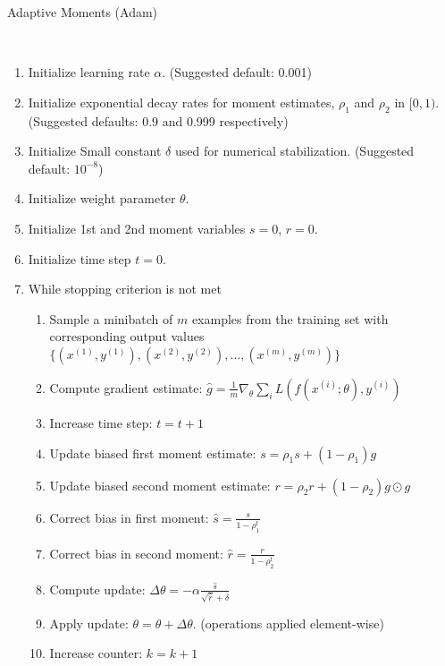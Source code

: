 \begin{algorithm}
	\caption{Adaptive Moments (Adam) \cite{goodfellow2016deep}}\label{alg:adam}
	\begin{algorithmic}
		\\
		\begin{enumerate}
			\item Initialize learning rate $\alpha$. (Suggested default: 0.001)
			\item Initialize exponential decay rates for moment estimates, $\rho_1$ and $\rho_2$ in $[0,1)$.
			(Suggested defaults: 0.9 and 0.999 respectively)		
			\item Initialize Small constant $\delta$ used for numerical stabilization. (Suggested default: $10^{-8}$)
			\item Initialize weight parameter $\theta$.
			\item Initialize 1st and 2nd moment variables $s = 0$, $r = 0$.
			\item Initialize time step $t = 0$.
			\item While stopping criterion is not met
			\begin{enumerate}[label=\emph{\alph*})]
				\item Sample a minibatch of $m$ examples from the training set with corresponding output values
				$\{(x^{(1)}, y^{(1)}), (x^{(2)}, y^{(2)}), ..., (x^{(m)}, y^{(m)})\}$
				\item Compute gradient estimate: $\hat{g} = \frac{1}{m} \nabla_\theta \sum_i L(f(x^{(i)};\theta), y^{(i)})$
				\item Increase time step: $t = t + 1$
				\item Update biased first moment estimate: $s = \rho_1 s + (1-\rho_1) g$
				\item Update biased second moment estimate: $r = \rho_2 r + (1-\rho_2) g \odot g$
				\item Correct bias in first moment: $\hat{s} = \frac{s}{1 - \rho_1^t}$
				\item Correct bias in second moment: $\hat{r} = \frac{r}{1 - \rho_2^t}$
				\item Compute update: $\Delta \theta = - \alpha \frac{\hat{s} }{\sqrt{\hat{r}} + \delta}$
				\item Apply update: $\theta = \theta + \Delta \theta$. (operations applied element-wise)
				\item Increase counter: $k = k + 1$
			\end{enumerate}
		\end{enumerate}
	\end{algorithmic}
\end{algorithm}

